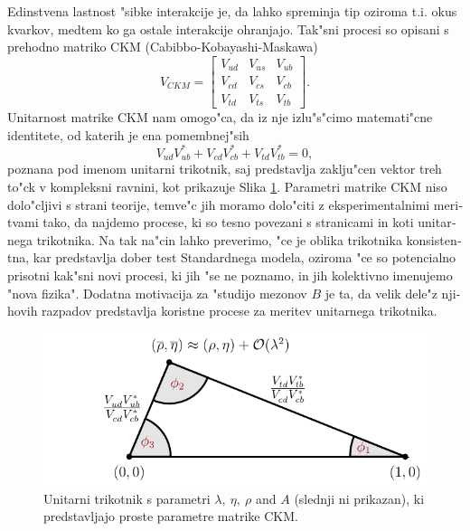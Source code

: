 \begin{otherlanguage}{slovene}
Edinstvena lastnost "sibke interakcije je, da lahko spreminja tip oziroma t.i. okus kvarkov, medtem ko ga ostale interakcije ohranjajo. Tak"sni procesi so opisani s prehodno matriko CKM (Cabibbo-Kobayashi-Maskawa) \cite{cabibbo1963unitary,kobayashi1973cp}
\begin{equation}
V_{CKM} = \begin{bmatrix}
    V_{ud} & V_{us} & V_{ub}\\
	V_{cd} & V_{cs} & V_{cb}\\
	V_{td} & V_{ts} & V_{tb}
\end{bmatrix}.
\end{equation}
Unitarnost matrike CKM nam omogo"ca, da iz nje izlu"s"cimo matemati"cne identitete, od katerih je ena pomembnej"sih
\begin{equation}
V_{ud}V_{ub}^* + V_{cd}V_{cb}^* + V_{td}V_{tb}^* = 0,
\end{equation}
poznana pod imenom unitarni trikotnik, saj predstavlja zaklju"cen vektor treh to"ck v kompleksni ravnini, kot prikazuje Slika \ref{fig:ut_si}. Parametri matrike CKM niso dolo"cljivi s strani teorije, temve"c jih moramo dolo"citi z eksperimentalnimi meritvami tako, da najdemo procese, ki so tesno povezani s stranicami in koti unitarnega trikotnika. Na tak na"cin lahko preverimo, "ce je oblika trikotnika konsistentna, kar predstavlja dober test Standardnega modela, oziroma "ce so potencialno prisotni kak"sni novi procesi, ki jih "se ne poznamo, in jih kolektivno imenujemo "nova fizika". Dodatna motivacija za "studijo mezonov $B$ je ta, da velik dele"z njihovih razpadov predstavlja koristne procese za meritev unitarnega trikotnika.
\begin{figure}[H]
\centering
\includegraphics[scale=1]{texfig/UT_Triangle}
\caption{Unitarni trikotnik s parametri $\lambda,~\eta,~\rho$ and $A$ (slednji ni prikazan), ki predstavljajo proste parametre matrike CKM.} %
\label{fig:ut_si}
\end{figure}


\end{otherlanguage}
